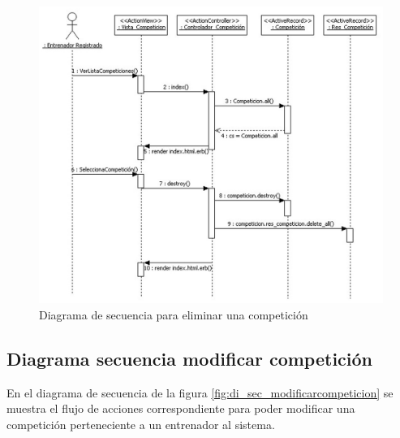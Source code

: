 		  \begin{figure}[H]
			  \centering
			    \includegraphics[width=15cm]{./eps/di_diagsecuencia/Competicion_Eliminar.eps}
			  \caption{Diagrama de secuencia para eliminar una competición}
			  \label{fig:di_sec_eliminarcompeticion}
			\end{figure}
		
		  \newpage
		
		\subsection{Diagrama secuencia modificar competición} %
		  \label{sub:diagrama_secuencia_modificar_competicion}
		  
		  En el diagrama de secuencia de la figura \ref{fig:di_sec_modificarcompeticion} se muestra el flujo de acciones correspondiente para poder modificar una competición perteneciente a un entrenador al sistema.
		  
